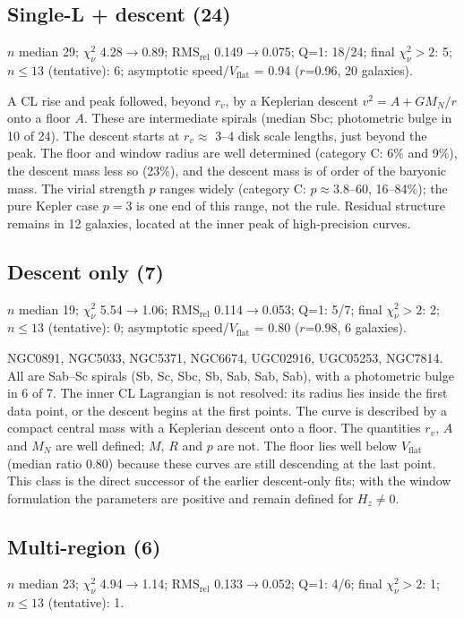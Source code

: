 \documentclass[10pt]{article}
\begin{document}
\subsection{Single-L + descent (24)}
$n$ median 29; $\chi^2_\nu$ 4.28$\to$0.89; RMS$_\mathrm{rel}$ 0.149$\to$0.075; Q=1: 18/24; final $\chi^2_\nu>2$: 5; $n\le13$ (tentative): 6; asymptotic speed/$V_\mathrm{flat}$ = 0.94 ($r$=0.96, 20 galaxies).

A CL rise and peak followed, beyond $r_v$, by a Keplerian descent $v^2=A+GM_N/r$ onto a floor $A$. These are intermediate spirals (median Sbc; photometric bulge in 10 of 24). The descent starts at $r_v\approx$ 3--4 disk scale lengths, just beyond the peak. The floor and window radius are well determined (category C: 6\% and 9\%), the descent mass less so (23\%), and the descent mass is of order of the baryonic mass. The virial strength $p$ ranges widely (category C: $p\approx3.8$--60, 16--84\%); the pure Kepler case $p=3$ is one end of this range, not the rule. Residual structure remains in 12 galaxies, located at the inner peak of high-precision curves.

\subsection{Descent only (7)}
$n$ median 19; $\chi^2_\nu$ 5.54$\to$1.06; RMS$_\mathrm{rel}$ 0.114$\to$0.053; Q=1: 5/7; final $\chi^2_\nu>2$: 2; $n\le13$ (tentative): 0; asymptotic speed/$V_\mathrm{flat}$ = 0.80 ($r$=0.98, 6 galaxies).

NGC0891, NGC5033, NGC5371, NGC6674, UGC02916, UGC05253, NGC7814. All are Sab--Sc spirals (Sb, Sc, Sbc, Sb, Sab, Sab, Sab), with a photometric bulge in 6 of 7. The inner CL Lagrangian is not resolved: its radius lies inside the first data point, or the descent begins at the first points. The curve is described by a compact central mass with a Keplerian descent onto a floor. The quantities $r_v$, $A$ and $M_N$ are well defined; $M$, $R$ and $p$ are not. The floor lies well below $V_\mathrm{flat}$ (median ratio 0.80) because these curves are still descending at the last point. This class is the direct successor of the earlier descent-only fits; with the window formulation the parameters are positive and remain defined for $H_z\neq0$.

\subsection{Multi-region (6)}
$n$ median 23; $\chi^2_\nu$ 4.94$\to$1.14; RMS$_\mathrm{rel}$ 0.133$\to$0.052; Q=1: 4/6; final $\chi^2_\nu>2$: 1; $n\le13$ (tentative): 1.
\end{document}
